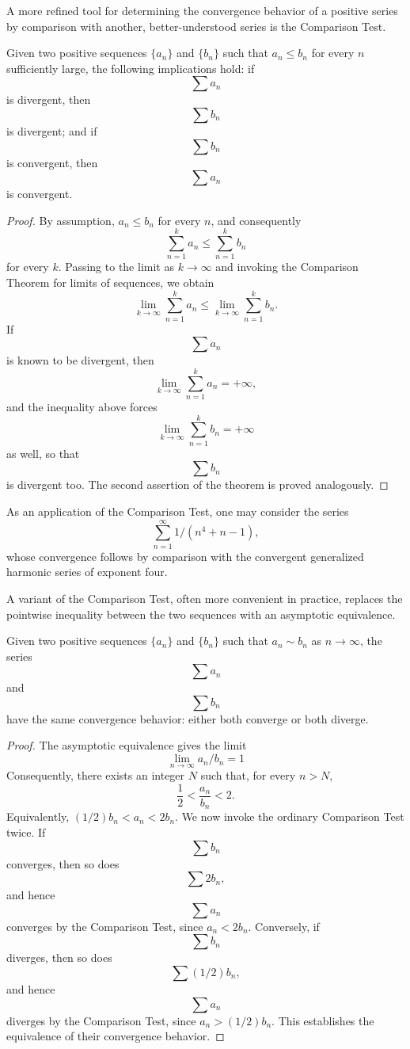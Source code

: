 A more refined tool for determining the convergence behavior of a positive series by comparison with another, better-understood series is the Comparison Test.

\begin{theorem}
Given two positive sequences $\{a_n\}$ and $\{b_n\}$ such that $a_n \leq b_n$ for every $n$ sufficiently large, the following implications hold: if \[
\sum a_n
\] is divergent, then \[
\sum b_n
\] is divergent; and if \[
\sum b_n
\] is convergent, then \[
\sum a_n
\] is convergent.
\end{theorem}

\begin{proof}
By assumption, $a_n \leq b_n$ for every $n$, and consequently \[
\sum_{n=1}^{k} a_n \leq \sum_{n=1}^{k} b_n
\] for every $k$. Passing to the limit as $k \to \infty$ and invoking the Comparison Theorem for limits of sequences, we obtain
\[
\lim_{k \to \infty} \sum_{n=1}^{k} a_n \leq \lim_{k \to \infty} \sum_{n=1}^{k} b_n.
\]
If \[
\sum a_n
\] is known to be divergent, then \[
\lim_{k \to \infty} \sum_{n=1}^{k} a_n = +\infty,
\] and the inequality above forces \[
\lim_{k \to \infty} \sum_{n=1}^{k} b_n = +\infty
\] as well, so that \[
\sum b_n
\] is divergent too. The second assertion of the theorem is proved analogously.
\end{proof}

As an application of the Comparison Test, one may consider the series
\[
\sum_{n=1}^{\infty} 1/(n^4 + n - 1),
\]
whose convergence follows by comparison with the convergent generalized harmonic series of exponent four.

A variant of the Comparison Test, often more convenient in practice, replaces the pointwise inequality between the two sequences with an asymptotic equivalence.

\begin{theorem}
Given two positive sequences $\{a_n\}$ and $\{b_n\}$ such that $a_n \sim b_n$ as $n \to \infty$, the series \[
\sum a_n
\] and \[
\sum b_n
\] have the same convergence behavior: either both converge or both diverge.
\end{theorem}

\begin{proof}
The asymptotic equivalence gives the limit
\[
\lim_{n \to \infty} a_n / b_n = 1
\]
Consequently, there exists an integer $N$ such that, for every $n>N$,
\[
\frac{1}{2} < \frac{a_n}{b_n} < 2.
\]
Equivalently, $(1/2)b_n<a_n<2b_n$. We now invoke the ordinary Comparison Test twice. If \[
\sum b_n
\] converges, then so does \[
\sum 2 b_n,
\] and hence \[
\sum a_n
\] converges by the Comparison Test, since $a_n < 2 b_n$. Conversely, if \[
\sum b_n
\] diverges, then so does \[
\sum (1/2) b_n,
\] and hence \[
\sum a_n
\] diverges by the Comparison Test, since $a_n > (1/2) b_n$. This establishes the equivalence of their convergence behavior.
\end{proof}

